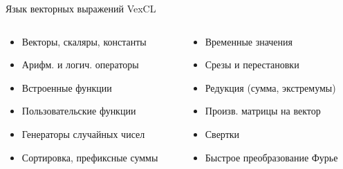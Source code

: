 \documentclass[@BEAMER_OPTIONS@]{beamer}
\begin{document}
\begin{frame}[fragile]{Язык векторных выражений VexCL}
    \begin{columns}
        \begin{column}{0.4\textwidth}
            \begin{itemize}
                \item Векторы, скаляры, константы
                \item Арифм. и логич. операторы
                \item Встроенные функции
                \item Пользовательские функции
                \item Генераторы случайных чисел
                \item Сортировка, префиксные суммы
            \end{itemize}
        \end{column}
                \begin{column}{0.4\textwidth}
                    \begin{itemize}
                        \item Временные значения
                        \item Срезы и перестановки
                        \item Редукция (сумма, экстремумы)
                        \item Произв. матрицы на вектор
                        \item Свертки
                        \item Быстрое преобразование Фурье
                    \end{itemize}
                \end{column}
    \end{columns}
\end{frame}

\end{document}
